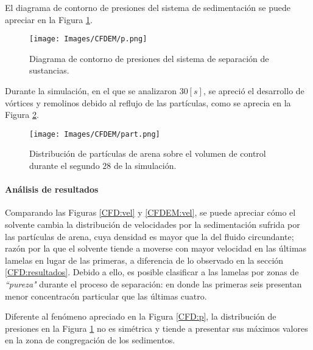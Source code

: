 \newpage

\noindent
\justify

El diagrama de contorno de presiones del sistema de sedimentaci\'on se puede apreciar en la Figura \ref{CFDEM:p}.

\begin{figure}[h!]
	\centering
	\texttt{[image: Images/CFDEM/p.png]}
	\caption{Diagrama de contorno de presiones del sistema de separaci\'on de sustancias.}
	\label{CFDEM:p}
\end{figure}

\noindent
\justify

Durante la simulaci\'on, en el que se analizaron $30 [s]$, se apreci\'o el desarrollo de v\'ortices y remolinos debido al reflujo de las part\'iculas, como se aprecia en la Figura \ref{CFDEM:part}.

\begin{figure}[h!]
	\centering
	\texttt{[image: Images/CFDEM/part.png]}
	\caption{Distribuci\'on de part\'iculas de arena sobre el volumen de control durante el segundo $28$ de la simulaci\'on.}
	\label{CFDEM:part}
\end{figure}

\newpage

\paragraph{An\'alisis de resultados} \label{CFDEM:analisis}

\noindent
\justify

Comparando las Figuras \ref{CFD:vel} y \ref{CFDEM:vel}, se puede apreciar c\'omo el solvente cambia la distribuci\'on de velocidades por la sedimentaci\'on sufrida por las part\'iculas de arena, cuya densidad es mayor que la del fluido circundante; raz\'on por la que el solvente tiende a moverse con mayor velocidad en las \'ultimas lamelas en lugar de las primeras, a diferencia de lo observado en la secci\'on \ref{CFD:resultados}. Debido a ello, es posible clasificar a las lamelas por zonas de \textit{``pureza"} durante el proceso de separaci\'on: en donde las primeras seis presentan menor concentrac\'on particular que las \'ultimas cuatro.

\noindent
\justify

Diferente al fen\'omeno apreciado en la Figura \ref{CFD:p}, la distribuci\'on de presiones en la Figura \ref{CFDEM:p} no es sim\'etrica y tiende a presentar sus m\'aximos valores en la zona de congregaci\'on de los sedimentos.

